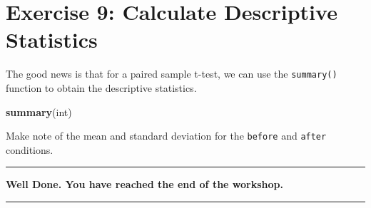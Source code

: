 \documentclass[
]{book}
\newenvironment{Shaded}{\begin{snugshade}}{\end{snugshade}}
\newcommand{\FunctionTok}[1]{\textcolor[rgb]{0.13,0.29,0.53}{\textbf{#1}}}
\newcommand{\NormalTok}[1]{#1}
\let\oldsection\section
\renewcommand{\section}{\needspace{5\baselineskip}\oldsection}
\begin{document}
\section{Exercise 9: Calculate Descriptive Statistics}\label{exercise-9-calculate-descriptive-statistics}

The good news is that for a paired sample t-test, we can use the \texttt{summary()} function to obtain the descriptive statistics.

\begin{Shaded}
\begin{Highlighting}[]
\FunctionTok{summary}\NormalTok{(int)}
\end{Highlighting}
\end{Shaded}

Make note of the mean and standard deviation for the \texttt{before} and \texttt{after} conditions.

\begin{center}\rule{0.5\linewidth}{0.5pt}\end{center}

\textbf{Well Done. You have reached the end of the workshop.}

\begin{center}\rule{0.5\linewidth}{0.5pt}\end{center}

  
\end{document}
